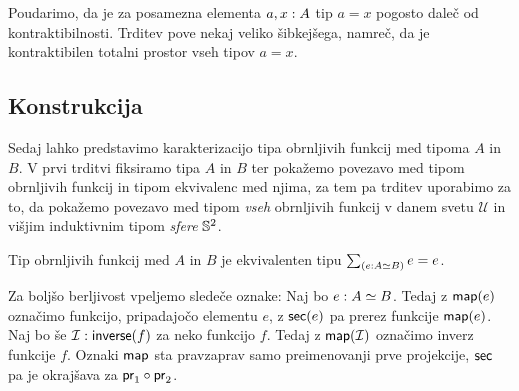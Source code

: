 Poudarimo, da je za posamezna elementa \(a, x : A\) tip \(a = x\) pogosto daleč od kontraktibilnosti. Trditev pove nekaj veliko šibkejšega, namreč, da je kontraktibilen totalni prostor vseh tipov \(a = x\).

\subsection{Konstrukcija}

Sedaj lahko predstavimo karakterizacijo tipa obrnljivih funkcij med tipoma \(A\) in \(B\). V prvi trditvi fiksiramo tipa \(A\) in \(B\) ter pokažemo povezavo med tipom obrnljivih funkcij in tipom ekvivalenc med njima, za tem pa trditev uporabimo za to, da pokažemo povezavo med tipom \emph{vseh} obrnljivih funkcij v danem svetu \(\mathcal{U}\) in višjim induktivnim tipom \emph{sfere} \(\mathbb{S}^{2}\).

\begin{trditev}
  \label{main-char}
  Tip obrnljivih funkcij med \(A\) in \(B\) je ekvivalenten tipu \(\textstyle \sum_{\left( e : A \simeq B \right)} e = e\).
\end{trditev}

Za boljšo berljivost vpeljemo sledeče oznake: Naj bo \(e : A \simeq B\). Tedaj z \(\textnormal{\textsf{map}}(e)\) označimo funkcijo, pripadajočo elementu \(e\), z \(\textnormal{\textsf{sec}}(e)\) pa prerez funkcije \(\textnormal{\textsf{map}}(e)\). Naj bo še \(\mathcal{I} : \textnormal{\textsf{inverse}}(f)\) za neko funkcijo \(f\). Tedaj z \(\textnormal{\textsf{map}}(\mathcal{I})\) označimo inverz funkcije \(f\). Oznaki \(\textnormal{\textsf{map}}\) sta pravzaprav samo preimenovanji prve projekcije, \(\textnormal{\textsf{sec}}\) pa je okrajšava za \(\textnormal{\textsf{pr}}_{1} \circ \textnormal{\textsf{pr}}_{2}\).

